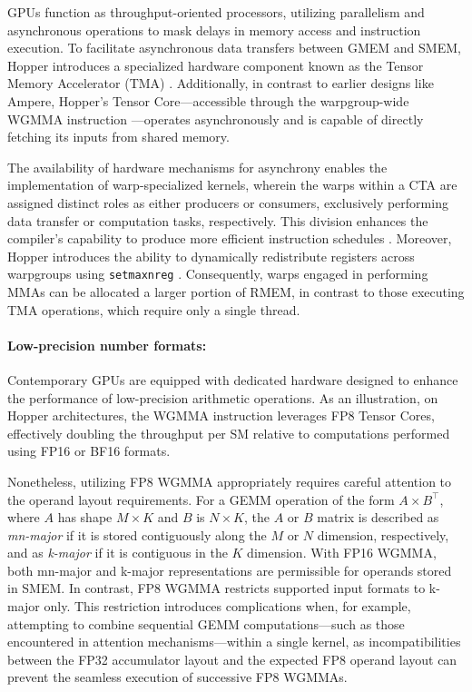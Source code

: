 GPUs function as throughput-oriented processors, utilizing parallelism and asynchronous operations to mask delays in memory access and instruction execution. To facilitate asynchronous data transfers between GMEM and SMEM, Hopper introduces a specialized hardware component known as the Tensor Memory Accelerator (TMA) \cite[\S7.29]{cuda}. Additionally, in contrast to earlier designs like Ampere, Hopper’s Tensor Core—accessible through the warpgroup-wide WGMMA instruction \cite[\S9.7.14]{ptx}—operates asynchronously and is capable of directly fetching its inputs from shared memory.

The availability of hardware mechanisms for asynchrony enables the implementation of warp-specialized kernels, wherein the warps within a CTA are assigned distinct roles as either producers or consumers, exclusively performing data transfer or computation tasks, respectively. This division enhances the compiler’s capability to produce more efficient instruction schedules \citep{warp-specialization-2011}. Moreover, Hopper introduces the ability to dynamically redistribute registers across warpgroups using \verb|setmaxnreg| \cite[\S9.7.17.1]{ptx}. Consequently, warps engaged in performing MMAs can be allocated a larger portion of RMEM, in contrast to those executing TMA operations, which require only a single thread.

\paragraph{Low-precision number formats:}
\label{sec:low-precision-gpu}
Contemporary GPUs are equipped with dedicated hardware designed to enhance the performance of low-precision arithmetic operations. As an illustration, on Hopper architectures, the WGMMA instruction leverages FP8 Tensor Cores, effectively doubling the throughput per SM relative to computations performed using FP16 or BF16 formats.

Nonetheless, utilizing FP8 WGMMA appropriately requires careful attention to the operand layout requirements. For a GEMM operation of the form $A \times B^{\top}$, where $A$ has shape $M\times K$ and $B$ is $N\times K$, the $A$ or $B$ matrix is described as \emph{mn-major} if it is stored contiguously along the $M$ or $N$ dimension, respectively, and as \emph{k-major} if it is contiguous in the $K$ dimension. With FP16 WGMMA, both mn-major and k-major representations are permissible for operands stored in SMEM. In contrast, FP8 WGMMA restricts supported input formats to k-major only. This restriction introduces complications when, for example, attempting to combine sequential GEMM computations—such as those encountered in attention mechanisms—within a single kernel, as incompatibilities between the FP32 accumulator layout and the expected FP8 operand layout can prevent the seamless execution of successive FP8 WGMMAs.

